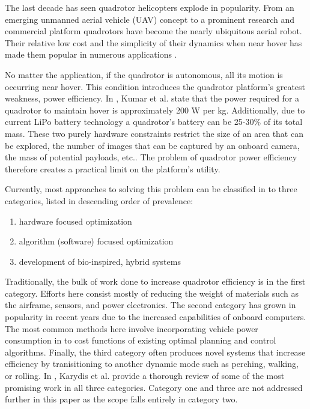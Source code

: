 
The last decade has seen quadrotor helicopters explode in popularity. From an emerging unmanned aerial vehicle (UAV) concept to a prominent research and commercial platform \cite{kumar2012opportunities,hoffmann2007quadrotor} quadrotors have become the nearly ubiquitous aerial robot. Their relative low cost and the simplicity of their dynamics when near hover \cite{bouabdallah2004pid} has made them popular in numerous applications \cite{heng2015efficient,roberts2017submodular,frazzoli2002real}. 

No matter the application, if the quadrotor is autonomous, all its motion is occurring near hover. This condition introduces the quadrotor platform's greatest weakness, power efficiency. In \cite{kumar2012opportunities}, Kumar et al. state that the power required for a quadrotor to maintain hover is approximately 200 W per kg. Additionally, due to current LiPo battery technology a quadrotor's battery can be 25-30\% of its total mass. These two purely hardware constraints restrict the size of an area that can be explored, the number of images that can be captured by an onboard camera, the mass of potential payloads, etc.. The problem of quadrotor power efficiency therefore creates a practical limit on the platform's utility. 

Currently, most approaches to solving this problem can be classified in to three categories, listed in descending order of prevalence: 
\begin{enumerate}
	\item hardware focused optimization
	\item algorithm (software) focused optimization
	\item development of bio-inspired, hybrid systems
\end{enumerate}
Traditionally, the bulk of work done to increase quadrotor efficiency is in the first category. Efforts here consist mostly of reducing the weight of materials such as the airframe, sensors, and power electronics. The second category has grown in popularity in recent years due to the increased capabilities of onboard computers. The most common methods here involve incorporating vehicle power consumption in to cost functions of existing optimal planning and control algorithms. Finally, the third category often produces novel systems that increase efficiency by tranisitioning to another dynamic mode such as perching, walking, or rolling. In \cite{karydis2017energetics}, Karydis et al. provide a thorough review of some of the most promising work in all three categories. Category one and three are not addressed further in this paper as the scope falls entirely in category two.

